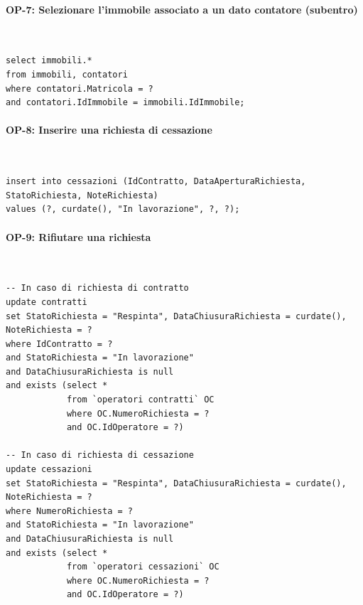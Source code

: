 \documentclass[a4paper,12pt]{report}
\begin{document}
\paragraph{OP-7: Selezionare l'immobile associato a un dato contatore (subentro)}\mbox{}\\
\begin{lstlisting}
select immobili.*
from immobili, contatori
where contatori.Matricola = ?
and contatori.IdImmobile = immobili.IdImmobile;
\end{lstlisting}

\paragraph{OP-8: Inserire una richiesta di cessazione}\mbox{}\\
\begin{lstlisting}
insert into cessazioni (IdContratto, DataAperturaRichiesta, StatoRichiesta, NoteRichiesta)
values (?, curdate(), "In lavorazione", ?, ?);
\end{lstlisting}

\paragraph{OP-9: Rifiutare una richiesta}\mbox{}\\
\begin{lstlisting}
-- In caso di richiesta di contratto
update contratti
set StatoRichiesta = "Respinta", DataChiusuraRichiesta = curdate(), NoteRichiesta = ?
where IdContratto = ?
and StatoRichiesta = "In lavorazione"
and DataChiusuraRichiesta is null
and exists (select *
            from `operatori contratti` OC
            where OC.NumeroRichiesta = ?
            and OC.IdOperatore = ?)

-- In caso di richiesta di cessazione
update cessazioni
set StatoRichiesta = "Respinta", DataChiusuraRichiesta = curdate(), NoteRichiesta = ?
where NumeroRichiesta = ?
and StatoRichiesta = "In lavorazione"
and DataChiusuraRichiesta is null
and exists (select *
            from `operatori cessazioni` OC
            where OC.NumeroRichiesta = ?
            and OC.IdOperatore = ?)
\end{lstlisting}
\end{document}

